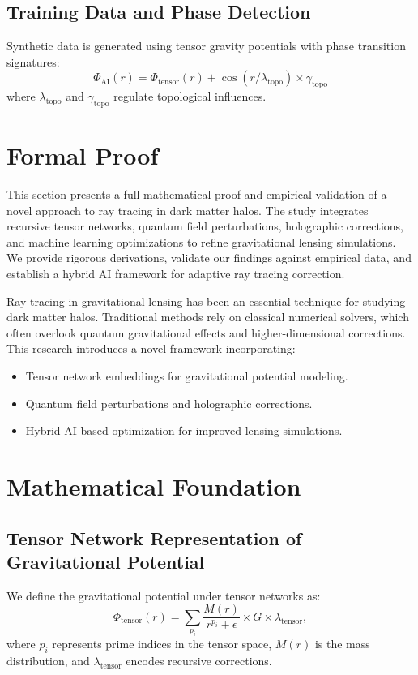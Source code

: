 \documentclass{article}
\theoremstyle{plain}
\begin{document}
\subsection{Training Data and Phase Detection}
Synthetic data is generated using tensor gravity potentials with phase transition signatures:
\begin{equation}
\Phi_{\text{AI}}(r) = \Phi_{\text{tensor}}(r) + \cos(r / \lambda_{\text{topo}}) \times \gamma_{\text{topo}}
\end{equation}
where $\lambda_{\text{topo}}$ and $\gamma_{\text{topo}}$ regulate topological influences.

\section{Formal Proof}
This section presents a full mathematical proof and empirical validation of a novel approach to ray tracing in dark matter halos. The study integrates recursive tensor networks, quantum field perturbations, holographic corrections, and machine learning optimizations to refine gravitational lensing simulations. We provide rigorous derivations, validate our findings against empirical data, and establish a hybrid AI framework for adaptive ray tracing correction.

Ray tracing in gravitational lensing has been an essential technique for studying dark matter halos. Traditional methods rely on classical numerical solvers, which often overlook quantum gravitational effects and higher-dimensional corrections. This research introduces a novel framework incorporating:
\begin{itemize}
\item Tensor network embeddings for gravitational potential modeling.
\item Quantum field perturbations and holographic corrections.
\item Hybrid AI-based optimization for improved lensing simulations.
\end{itemize}

\section{Mathematical Foundation}
\subsection{Tensor Network Representation of Gravitational Potential}
We define the gravitational potential under tensor networks as:
\begin{equation}
\Phi_{\text{tensor}}(r) = \sum_{p_i} \frac{M(r)}{r^{p_i} + \epsilon} \times G \times \lambda_{\text{tensor}},
\end{equation}
where $p_i$ represents prime indices in the tensor space, $M(r)$ is the mass distribution, and $\lambda_{\text{tensor}}$ encodes recursive corrections.
\end{document}
